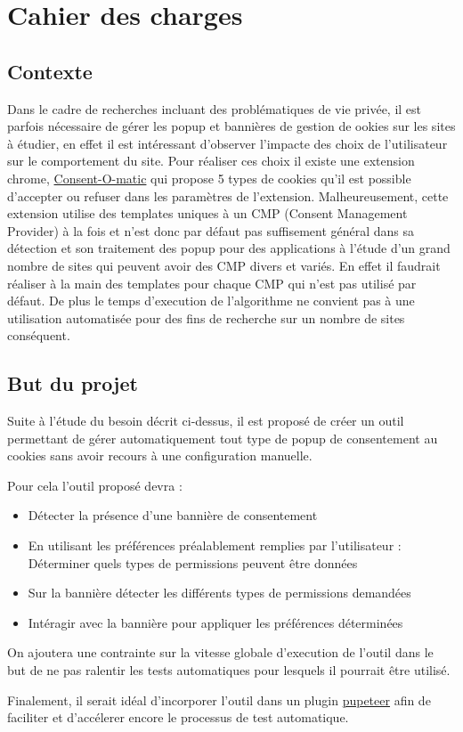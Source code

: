 
\section{Cahier des charges}
\subsection{Contexte}
Dans le cadre de recherches incluant des problématiques de vie privée, il est parfois nécessaire de gérer les popup et bannières de gestion de ookies sur les sites à étudier, en effet il est intéressant d'observer l'impacte des choix de l'utilisateur sur le comportement du site.
Pour réaliser ces choix il existe une extension chrome, \href{https://github.com/cavi-au/Consent-O-Matic}{Consent-O-matic} qui propose 5 types de cookies qu'il est possible d'accepter ou refuser dans les paramètres de l'extension. Malheureusement, cette extension utilise des templates uniques à un CMP (Consent Management Provider) à la fois et n'est donc par défaut pas suffisement général dans sa détection et son traitement des popup pour des applications à l'étude d'un grand nombre de sites qui peuvent avoir des CMP divers et variés. En effet il faudrait réaliser à la main des templates pour chaque CMP qui n'est pas utilisé par défaut.
De plus le temps d'execution de l'algorithme ne convient pas à une utilisation automatisée pour des fins de recherche sur un nombre de sites conséquent.
\subsection{But du projet}
Suite à l'étude du besoin décrit ci-dessus, il est proposé de créer un outil permettant de gérer automatiquement tout type de popup de consentement au cookies sans avoir recours à une configuration manuelle.

Pour cela l'outil proposé devra :

\begin{itemize}
	\item Détecter la présence d'une bannière de consentement
	\item En utilisant les préférences préalablement remplies par l'utilisateur :
	\subitem Déterminer quels types de permissions peuvent être données
	\item Sur la bannière détecter les différents types de permissions demandées
	\item Intéragir avec la bannière pour appliquer les préférences déterminées
\end{itemize}

On ajoutera une contrainte sur la vitesse globale d'execution de l'outil dans le but de ne pas ralentir les tests automatiques pour lesquels il pourrait être utilisé.

Finalement, il serait idéal d'incorporer l'outil dans un plugin \href{https://github.com/puppeteer/puppeteer}{pupeteer} afin de faciliter et d'accélerer encore le processus de test automatique.